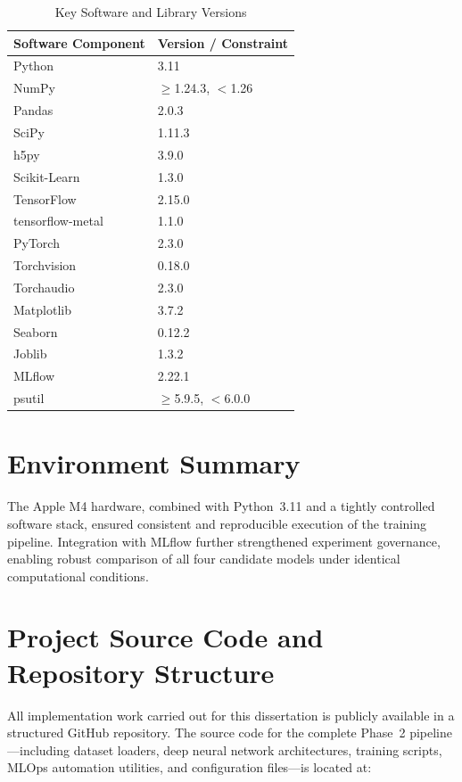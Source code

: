 \begin{table}[H]
\centering
\caption{Key Software and Library Versions}
\label{tab:software}
\begin{tabular}{|l|l|}
\hline
\textbf{Software Component} & \textbf{Version / Constraint} \\ \hline
Python & 3.11 \\ \hline
NumPy & $\geq$1.24.3, $<$1.26 \\ \hline
Pandas & 2.0.3 \\ \hline
SciPy & 1.11.3 \\ \hline
h5py & 3.9.0 \\ \hline
Scikit-Learn & 1.3.0 \\ \hline
TensorFlow & 2.15.0 \\ \hline
tensorflow-metal & 1.1.0 \\ \hline
PyTorch & 2.3.0 \\ \hline
Torchvision & 0.18.0 \\ \hline
Torchaudio & 2.3.0 \\ \hline
Matplotlib & 3.7.2 \\ \hline
Seaborn & 0.12.2 \\ \hline
Joblib & 1.3.2 \\ \hline
MLflow & 2.22.1 \\ \hline
psutil & $\geq$5.9.5, $<$6.0.0 \\ \hline
\end{tabular}
\end{table}

\section{Environment Summary}

The Apple M4 hardware, combined with Python~3.11 and a tightly controlled software stack, ensured consistent and reproducible execution of the training pipeline. Integration with MLflow further strengthened experiment governance, enabling robust comparison of all four candidate models under identical computational conditions.

\section{Project Source Code and Repository Structure}

All implementation work carried out for this dissertation is publicly available in a structured GitHub repository. 
The source code for the complete Phase~2 pipeline---including dataset loaders, deep neural network architectures, 
training scripts, MLOps automation utilities, and configuration files---is located at:

